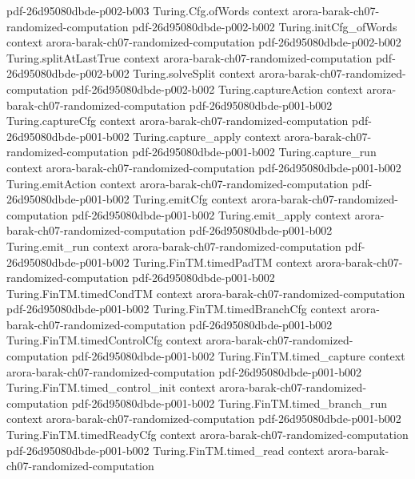 \begin{theorem}
  {pdf-26d95080dbde-p002-b003}
\proofstep
  {Turing.Cfg.ofWords}
  {context}
  {arora-barak-ch07-randomized-computation}
  {pdf-26d95080dbde-p002-b002}
\proofstep
  {Turing.initCfg_ofWords}
  {context}
  {arora-barak-ch07-randomized-computation}
  {pdf-26d95080dbde-p002-b002}
\proofstep
  {Turing.splitAtLastTrue}
  {context}
  {arora-barak-ch07-randomized-computation}
  {pdf-26d95080dbde-p002-b002}
\proofstep
  {Turing.solveSplit}
  {context}
  {arora-barak-ch07-randomized-computation}
  {pdf-26d95080dbde-p002-b002}
\proofstep
  {Turing.captureAction}
  {context}
  {arora-barak-ch07-randomized-computation}
  {pdf-26d95080dbde-p001-b002}
\proofstep
  {Turing.captureCfg}
  {context}
  {arora-barak-ch07-randomized-computation}
  {pdf-26d95080dbde-p001-b002}
\proofstep
  {Turing.capture_apply}
  {context}
  {arora-barak-ch07-randomized-computation}
  {pdf-26d95080dbde-p001-b002}
\proofstep
  {Turing.capture_run}
  {context}
  {arora-barak-ch07-randomized-computation}
  {pdf-26d95080dbde-p001-b002}
\proofstep
  {Turing.emitAction}
  {context}
  {arora-barak-ch07-randomized-computation}
  {pdf-26d95080dbde-p001-b002}
\proofstep
  {Turing.emitCfg}
  {context}
  {arora-barak-ch07-randomized-computation}
  {pdf-26d95080dbde-p001-b002}
\proofstep
  {Turing.emit_apply}
  {context}
  {arora-barak-ch07-randomized-computation}
  {pdf-26d95080dbde-p001-b002}
\proofstep
  {Turing.emit_run}
  {context}
  {arora-barak-ch07-randomized-computation}
  {pdf-26d95080dbde-p001-b002}
\proofstep
  {Turing.FinTM.timedPadTM}
  {context}
  {arora-barak-ch07-randomized-computation}
  {pdf-26d95080dbde-p001-b002}
\proofstep
  {Turing.FinTM.timedCondTM}
  {context}
  {arora-barak-ch07-randomized-computation}
  {pdf-26d95080dbde-p001-b002}
\proofstep
  {Turing.FinTM.timedBranchCfg}
  {context}
  {arora-barak-ch07-randomized-computation}
  {pdf-26d95080dbde-p001-b002}
\proofstep
  {Turing.FinTM.timedControlCfg}
  {context}
  {arora-barak-ch07-randomized-computation}
  {pdf-26d95080dbde-p001-b002}
\proofstep
  {Turing.FinTM.timed_capture}
  {context}
  {arora-barak-ch07-randomized-computation}
  {pdf-26d95080dbde-p001-b002}
\proofstep
  {Turing.FinTM.timed_control_init}
  {context}
  {arora-barak-ch07-randomized-computation}
  {pdf-26d95080dbde-p001-b002}
\proofstep
  {Turing.FinTM.timed_branch_run}
  {context}
  {arora-barak-ch07-randomized-computation}
  {pdf-26d95080dbde-p001-b002}
\proofstep
  {Turing.FinTM.timedReadyCfg}
  {context}
  {arora-barak-ch07-randomized-computation}
  {pdf-26d95080dbde-p001-b002}
\proofstep
  {Turing.FinTM.timed_read}
  {context}
  {arora-barak-ch07-randomized-computation}

\end{theorem}
